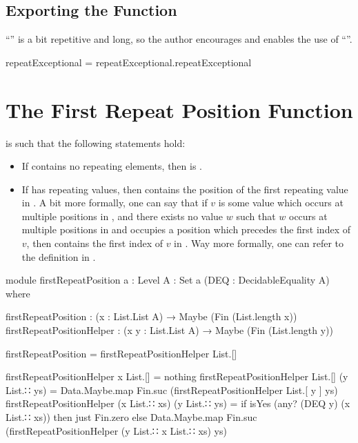 \documentclass{report}
\begin{document}
\subsection{Exporting the Function}
``'' is a bit repetitive and long, so the author encourages and enables the use of ``''.

\begin{code}
repeatExceptional = repeatExceptional.repeatExceptional
\end{code}

\section{The First Repeat Position Function}
 is such that the following statements hold:

\begin{itemize}
  \item If  contains no repeating elements, then    is .
  \item If  has repeating values, then    contains the position of the first repeating value in .  A bit more formally, one can say that if \(v\) is some value which occurs at multiple positions in , and there exists no value \(w\) such that \(w\) occurs at multiple positions in  and occupies a position which precedes the first index of \(v\), then    contains the first index of \(v\) in .  Way more formally, one can refer to the definition in .\label{enum:firstRepeatPosition-isFirst}
\end{itemize}

\begin{code}
module firstRepeatPosition
  {a : Level}
  {A : Set a}
  (DEQ : DecidableEquality A) where

  firstRepeatPosition : (x : List.List A) → Maybe (Fin (List.length x))
  firstRepeatPositionHelper : (x y : List.List A) → Maybe (Fin (List.length y))

  firstRepeatPosition = firstRepeatPositionHelper List.[]

  firstRepeatPositionHelper x List.[] = nothing
  firstRepeatPositionHelper List.[] (y List.∷ ys) =
    Data.Maybe.map Fin.suc (firstRepeatPositionHelper List.[ y ] ys)
  firstRepeatPositionHelper (x List.∷ xs) (y List.∷ ys) =
    if isYes (any? (DEQ y) (x List.∷ xs))
      then just Fin.zero
      else Data.Maybe.map Fin.suc (firstRepeatPositionHelper (y List.∷ x List.∷ xs) ys)
\end{code}
\end{document}
